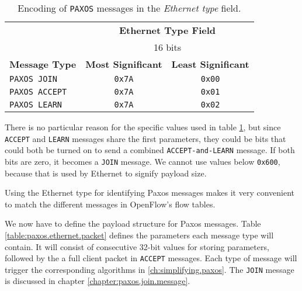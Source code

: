 \begin{table}[H]
  \centering
  \begin{tabular}{l|c|c|}
    \cline{2-3}
      & \multicolumn{2}{c|}{\textbf{Ethernet Type Field}} \\
      & \multicolumn{2}{c|}{16 bits} \\

    \hline
      \multicolumn{1}{|l|}{\textbf{Message Type}} &
      \textbf{Most Significant} &
      \textbf{Least Significant} \\

    \hline
      \multicolumn{1}{|l|}{\texttt{PAXOS JOIN}} &
      \texttt{0x7A} &
      \texttt{0x00} \\

    \hline
      \multicolumn{1}{|l|}{\texttt{PAXOS ACCEPT}} &
      \texttt{0x7A} &
      \texttt{0x01} \\

    \hline
      \multicolumn{1}{|l|}{\texttt{PAXOS LEARN}} &
      \texttt{0x7A} &
      \texttt{0x02} \\

    \hline
  \end{tabular}
  \caption{Encoding of \texttt{PAXOS} messages in the \textit{Ethernet
    type} field.}
  \label{table:paxos.ethernet.type.encoding}
\end{table}

There is no particular reason for the specific values used in table
\ref{table:paxos.ethernet.type.encoding}, but since \texttt{ACCEPT}
and \texttt{LEARN} messages share the first parameters, they
could be bits that could both be turned on to send a combined
\texttt{ACCEPT-and-LEARN} message.  If both bits are zero, it becomes
a \texttt{JOIN} message.
%
We cannot use values below \texttt{0x600}, because that is used by
Ethernet to signify payload size.

Using the Ethernet type for identifying Paxos messages makes it very
convenient to match the different messages in OpenFlow's flow
tables.

We now have to define the payload structure for Paxos messages.
Table \ref{table:paxos.ethernet.packet} defines the parameters
each message type will contain.
%
It will consist of consecutive 32-bit values for storing parameters,
followed by the a full client packet in \texttt{ACCEPT} messages.
%
Each type of message will trigger the corresponding algorithms in 
\vref{ch:simplifying.paxos}.  The \texttt{JOIN} message is discussed in
chapter \ref{chapter:paxos.join.message}.

